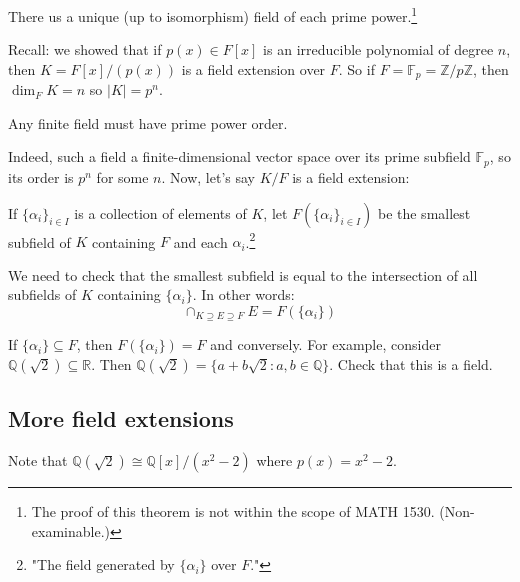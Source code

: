 \documentclass{article}
\theoremstyle{plain}
\newcommand{\Q}{\mathbb{Q}}
\newcommand{\R}{\mathbb{R}}
\newcommand{\Z}{\mathbb{Z}}
\newcommand{\on}[1]{\operatorname{#1}}
\begin{document}
\begin{theorem}{}{}
	There us a unique (up to isomorphism) field of each prime power.\footnote{The proof of this theorem is not within the scope of MATH 1530. (Non-examinable.)}
\end{theorem}
Recall: we showed that if $p(x) \in F[x]$ is an irreducible polynomial of degree $n$, then $K = F[x]/(p(x))$ is a field extension over $F$. So if $F = \mathbb{F}_p = \Z/p\Z$, then $\on{dim}_FK = n$ so $|K| = p^n$.
\begin{theorem}{}{}
	Any finite field must have prime power order.
\end{theorem}
Indeed, such a field a finite-dimensional vector space over its prime subfield $\mathbb{F}_p$, so its order is $p^n$ for some $n$. Now, let's say $K/F$ is a field extension:
\begin{definition}{}{}
	If $\{\alpha_i\}_{i \in I}$ is a collection of elements of $K$, let $F(\{\alpha_i\}_{i \in I})$ be the smallest subfield of $K$ containing $F$ and each $\alpha_i$.\footnote{"The field generated by $\{\alpha_i\}$ over $F$."}
\end{definition}
	We need to check that the smallest subfield is equal to the intersection of all subfields of $K$ containing $\{\alpha_i\}$. In other words:
	$$\cap_{K \supseteq E \supseteq F} E = F(\{\alpha_i\})$$	

If $\{\alpha_i\} \subseteq F$, then $F(\{\alpha_i\}) = F$ and conversely. For example, consider $\Q(\sqrt{2}) \subseteq \R$. Then $\Q(\sqrt{2}) = \{ a+b\sqrt{2} : a,b\in \Q \}$. Check that this is a field.

\subsection{More field extensions}
Note that $\Q(\sqrt{2}) \cong \Q[x]/(x^2-2)$ where $p(x) = x^2-2$.
\end{document}
